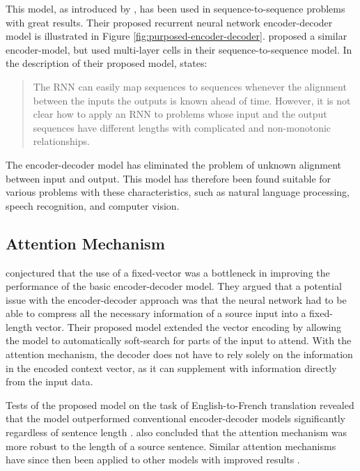 This model, as introduced by \cite{cho2014learning}, has been used in sequence-to-sequence problems with great results. Their proposed recurrent neural network encoder-decoder model is illustrated in Figure \ref{fig:purposed-encoder-decoder}. \cite{sutskever2014sequence} proposed a similar encoder-model, but used multi-layer cells in their sequence-to-sequence model. In the description of their proposed model, \cite{sutskever2014sequence} states:

\begin{quote}
    The RNN can easily map sequences to sequences whenever the alignment between the inputs the outputs is known ahead of time. However, it is not clear how to apply an RNN to problems whose input and the output sequences have different lengths with complicated and non-monotonic relationships.
\end{quote}

The encoder-decoder model has eliminated the problem of unknown alignment between input and output. This model has therefore been found suitable for various problems with these characteristics, such as natural language processing, speech recognition, and computer vision.

\subsection{Attention Mechanism}
\label{sec:attention_mechanism}
\cite{bahdanau2014neural} conjectured that the use of a fixed-vector was a bottleneck in improving the performance of the basic encoder-decoder model. They argued that a potential issue with the encoder-decoder approach was that the neural network had to be able to compress all the necessary information of a source input into a fixed-length vector. Their proposed model extended the vector encoding by allowing the model to automatically soft-search for parts of the input to attend. With the attention mechanism, the decoder does not have to rely solely on the information in the encoded context vector, as it can supplement with information directly from the input data.

Tests of the proposed model on the task of English-to-French translation revealed that the model outperformed conventional encoder-decoder models significantly regardless of sentence length \citep{bahdanau2014neural}. \cite{bahdanau2014neural} also concluded that the attention mechanism was more robust to the length of a source sentence. Similar attention mechanisms have since then been applied to other models with improved results \citep{hsu2016recurrent, sankaran2016temporal}. 

